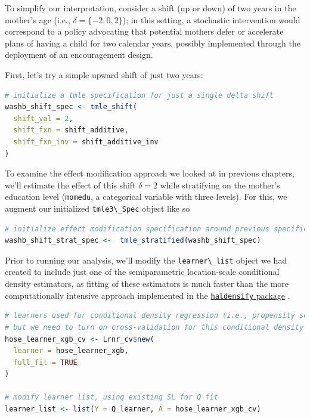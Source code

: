 \documentclass[
  12pt, krantz2,
]{book}
\newcommand{\passthrough}[1]{#1}
\theoremstyle{definition}
\theoremstyle{definition}
\theoremstyle{definition}
\newcommand{\1}{\mathbbm{1}}
\begin{document}
To simplify our interpretation, consider a shift (up or down) of two years in
the mother's age (i.e., \(\delta = \{-2, 0, 2\}\)); in this setting, a stochastic
intervention would correspond to a policy advocating that potential mothers
defer or accelerate plans of having a child for two calendar years, possibly
implemented through the deployment of an encouragement design.

First, let's try a simple upward shift of just two years:

\begin{lstlisting}[language=R]
# initialize a tmle specification for just a single delta shift
washb_shift_spec <- tmle_shift(
  shift_val = 2,
  shift_fxn = shift_additive,
  shift_fxn_inv = shift_additive_inv
)
\end{lstlisting}

To examine the effect modification approach we looked at in previous chapters,
we'll estimate the effect of this shift \(\delta = 2\) while stratifying on the
mother's education level (\passthrough{\lstinline!momedu!}, a categorical variable with three levels).
For this, we augment our initialized \passthrough{\lstinline!tmle3\_Spec!} object like so

\begin{lstlisting}[language=R]
# initialize effect modification specification around previous specification
washb_shift_strat_spec <-  tmle_stratified(washb_shift_spec)
\end{lstlisting}

Prior to running our analysis, we'll modify the \passthrough{\lstinline!learner\_list!} object we had
created to include just one of the semiparametric location-scale conditional
density estimators, as fitting of these estimators is much faster than the more
computationally intensive approach implemented in the
\href{ihttps://CRAN.R-project.org/package=haldensify}{\passthrough{\lstinline!haldensify!} package}
\citep{hejazi2020haldensify}.

\begin{lstlisting}[language=R]
# learners used for conditional density regression (i.e., propensity score),
# but we need to turn on cross-validation for this conditional density learner
hose_learner_xgb_cv <- Lrnr_cv$new(
  learner = hose_learner_xgb,
  full_fit = TRUE
)

# modify learner list, using existing SL for Q fit
learner_list <- list(Y = Q_learner, A = hose_learner_xgb_cv)
\end{lstlisting}
\end{document}
